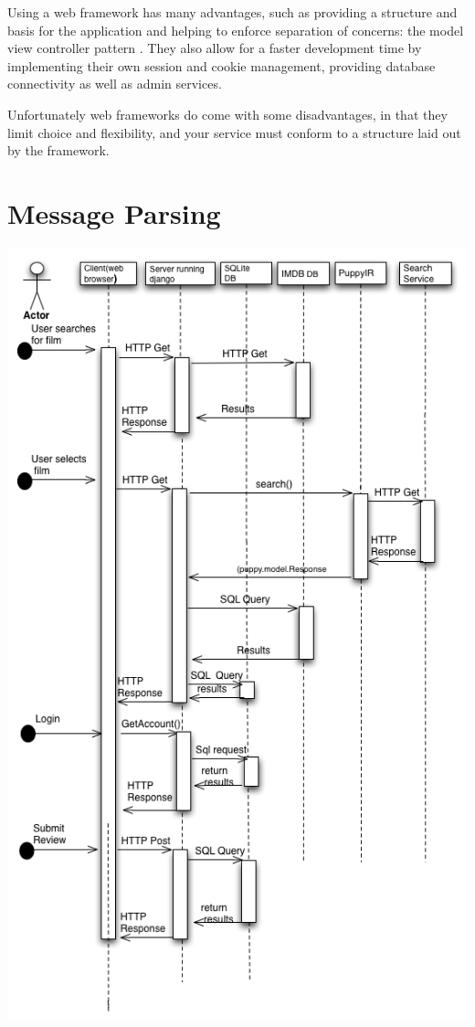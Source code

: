 \documentclass{sig-alt-release2}
\begin{document}
Using a web framework has many advantages, such as providing a structure and basis for the application and helping to enforce separation of concerns: the model view controller pattern . They also allow for a faster development time by implementing their own session and cookie management, providing database connectivity as well as admin services. 
 
Unfortunately web frameworks do come with some disadvantages, in that they limit choice and flexibility, and your service must conform to a structure laid out by the framework.

\section{Message Parsing}
\includegraphics[scale=0.4]{seqdiagram.png}
\end{document}
